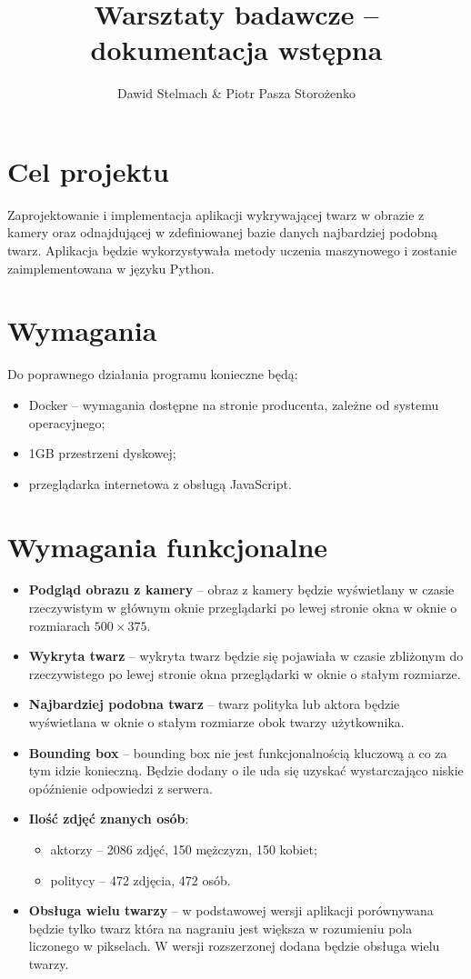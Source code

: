 \documentclass[a4paper]{mwart}
\author{Dawid Stelmach \& Piotr Pasza Storożenko}
\title{Warsztaty badawcze -- dokumentacja wstępna}
\begin{document}
\maketitle

\section{Cel projektu}

Zaprojektowanie i implementacja aplikacji wykrywającej twarz w obrazie z kamery oraz odnajdującej w zdefiniowanej bazie danych najbardziej podobną twarz. Aplikacja będzie wykorzystywała metody uczenia maszynowego i zostanie zaimplementowana w języku Python.

\section{Wymagania}

Do poprawnego działania programu konieczne będą:

\begin{itemize}
	\item Docker -- wymagania dostępne na stronie producenta, zależne od systemu operacyjnego;
	\item 1GB przestrzeni dyskowej;
	\item przeglądarka internetowa z obsługą JavaScript.
\end{itemize}

\section{Wymagania funkcjonalne}
\begin{itemize}
	\item \textbf{Podgląd obrazu z kamery} -- obraz z kamery będzie wyświetlany w czasie rzeczywistym w głównym oknie przeglądarki po lewej stronie okna w oknie o rozmiarach $500 \times 375$.
	\item \textbf{Wykryta twarz} -- wykryta twarz będzie się pojawiała w czasie zbliżonym do rzeczywistego po lewej stronie okna przeglądarki w oknie o stałym rozmiarze.
	\item \textbf{Najbardziej podobna twarz} -- twarz polityka lub aktora będzie wyświetlana w oknie o stałym rozmiarze obok twarzy użytkownika.
	\item \textbf{Bounding box} -- bounding box nie jest funkcjonalnością kluczową a co za tym idzie konieczną. Będzie dodany o ile uda się uzyskać wystarczająco niskie opóźnienie odpowiedzi z serwera.
	\item \textbf{Ilość zdjęć znanych osób}:
		\begin{itemize}
			\item aktorzy -- 2086 zdjęć, 150 mężczyzn, 150 kobiet;
			\item politycy -- 472 zdjęcia, 472 osób.
		\end{itemize}
	\item \textbf{Obsługa wielu twarzy} -- w podstawowej wersji aplikacji porównywana będzie tylko twarz która na nagraniu jest większa w rozumieniu pola liczonego w pikselach. W wersji rozszerzonej dodana będzie obsługa wielu twarzy.
\end{itemize}
\end{document}
